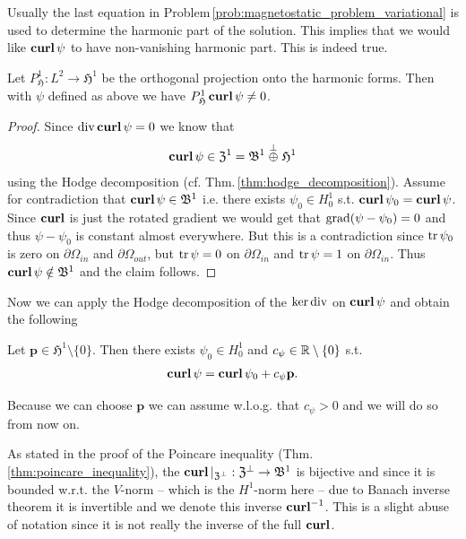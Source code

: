 \documentclass[../master_thesis.tex]{subfiles}
\begin{document}
Usually the last equation in Problem\,\ref{prob:magnetostatic_problem_variational} 
is used to determine the harmonic part of the 
solution. This implies that we would like $\veccurl \psi$ to have 
non-vanishing harmonic part. This is indeed true.
\begin{proposition}
    Let $P_\mathfrak{H}^1: L^2 \rightarrow \mathfrak{H}^1$ be the orthogonal
    projection onto the harmonic forms. Then with $\psi$ defined as above 
    we have $P_\mathfrak{H}^1\veccurl \psi \neq 0$.
\end{proposition}
\begin{proof}
    Since $\diver \veccurl \psi = 0$ we know that 
    \begin{align*}
        \veccurl \psi \in \mathfrak{Z}^1 = \mathfrak{B}^1 \stackrel{\perp}{\oplus} \mathfrak{H}^1
    \end{align*}
    using the Hodge decomposition (cf. Thm.\,\ref{thm:hodge_decomposition}). 
    Assume for contradiction that $\veccurl \psi \in \mathfrak{B}^1$ i.e. there exists 
    $\psi_0 \in H^1_0$ s.t. $\veccurl \psi_0 = \veccurl \psi$. 
    Since $\veccurl$ is just the rotated gradient we would get that 
    $\grad (\psi - \psi_0) = 0$ and thus $\psi - \psi_0$ is constant almost 
    everywhere. But this is a contradiction since $\tr \psi_0$ is zero on $\partial\Omega_{in}$ 
    and $\partial \Omega_{out}$, but $\tr \psi = 0$ on $\partial\Omega_{in}$ and 
    $\tr \psi = 1$ on $\partial\Omega_{in}$. 
    Thus $\veccurl \psi \notin \mathfrak{B}^1$ and the claim follows.
\end{proof}
Now we can apply the Hodge decomposition of the $\ker \diver$ on
$\veccurl \psi$ and obtain the following
\begin{corollary}
    Let $\mathbf{p}\in \mathfrak{H}^1 \setminus \{ 0 \}$. Then there exists 
    $\psi_0 \in H^1_0$ and $c_\psi \in \real \setminus \{ 0 \}$ s.t. 
    \begin{align*}
        \veccurl \psi = \veccurl \psi_0 + c_\psi \mathbf{p}.
    \end{align*}
\end{corollary}
Because we can choose $\mathbf{p}$ we can assume w.l.o.g. that $c_\psi > 0$ and 
we will do so from now on.

As stated in the proof of the Poincare inequality (Thm.\,\ref{thm:poincare_inequality}), 
the $\veccurl| _{\mathfrak{Z}^\perp}: \mathfrak{Z}^\perp \rightarrow \mathfrak{B}^1$
is bijective and since it is bounded w.r.t. the $V$-norm -- which is the 
$H^1$-norm here -- due to Banach inverse theorem it is invertible and we denote this 
inverse $\veccurl^{-1}$. This is a slight abuse of notation since it is not really 
the inverse of the full $\veccurl$.
\end{document}
